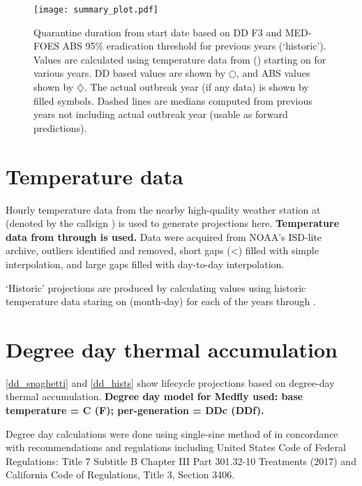 \documentclass[10pt]{article}
\begin{document}
\begin{figure}[H]
\centering
\texttt{[image: summary\_plot.pdf]}
\caption{
\label{summary_plot}
Quarantine duration from start date based on DD F3 and MED-FOES ABS 95\% eradication threshold for previous years (`historic').
Values are calculated using temperature data from \VarStationDescription (\VarStation) starting on \VarStartDOY 
for various years.  DD based values are shown by $\bigcirc$, and ABS values shown by $\diamondsuit$.  
The actual outbreak year (if any data) is shown by filled symbols.
Dashed lines are medians computed from previous years not including actual outbreak year (usable as forward predictions).
}
\end{figure}

\section*{Temperature data}

Hourly temperature data from the nearby high-quality weather station at 
\textbf{\VarStationDescription} (denoted by the callsign \VarStation) is used to generate
projections here.
\textbf{Temperature data from \VarTempStartDate through \VarEndDateOfTempData is used.}
Data were acquired from NOAA's ISD-lite archive,
outliers identified and removed, 
short gaps (\textless \VarLargeGapSize [HH:MM:SS]) filled with simple interpolation, 
and large gaps filled with day-to-day interpolation.\cite{10.12688/f1000research.12817.1}

`Historic' projections are produced by calculating values using historic temperature data 
staring on \VarStartDOY (month-day) for each of the years \VarTempStartYear through \VarTempEndYear.


\section*{Degree day thermal accumulation}

\autoref{dd_spaghetti} and \autoref{dd_hists} show lifecycle projections based on 
degree-day thermal accumulation.
\textbf{Degree day model for Medfly used:
base temperature = \VarDDBaseTempC \degree C (\VarDDBaseTempF \degree F);
per-generation = \VarGenDDc DDc (\VarGenDDf DDf).}

Degree day calculations were done using single-sine method of \citet{ECY:ECY1969503514}
in concordance with recommendations and regulations including 
United States Code of Federal Regulations: Title 7 Subtitle B Chapter III Part 301.32-10 Treatments (2017)\cite{US-301.32-10}
and California Code of Regulations, Title 3, Section 3406\cite{3-CA-ADC-3406}.
\end{document}
